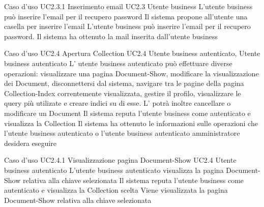 \UCtitle
{Caso d'uso UC2.3.1}
{Inserimento email}
\UC
{UC2.3}
{Utente business}
{L'utente business può inserire l'email per il recupero password}
{Il sistema propone all'utente una casella per inserire l'email}
\scenario
{L'utente business può inserire l'email per il recupero password.}
\post
{Il sistema ha ottenuto la mail inserita dall'utente business}


\UCtitle
{Caso d'uso UC2.4}
{Apertura Collection}
\UC
{UC2.4}
{Utente business autenticato, Utente business autenticato }
{L’ utente business autenticato può effettuare diverse operazioni: visualizzare una pagina Document-Show, modificare la visualizzazione dei Document, disconnettersi dal sistema, navigare tra le pagine della pagina Collection-Index correntemente visualizzata,  gestire il profilo, visualizzare le query più utilizate e creare indici su di esse. L' potrà inoltre cancellare o modificare un Document}
{Il sistema reputa l'utente business come autenticato e visualizza la Collection}
\post
{Il sistema ha ottenuto le informazioni sulle operazioni che l'utente business autenticato o l'utente business autenticato amministratore desidera eseguire}



\UCtitle
{Caso d'uso UC2.4.1}
{Visualizzazione pagina Document-Show}
\UC
{UC2.4}
{Utente business autenticato}
{L'utente business autenticato visualizza la pagina Document-Show relativa alla chiave selezionata}
{Il sistema reputa l'utente business come autenticato e visualizza la Collection scelta}
\post
{Viene visualizzata la pagina Document-Show relativa alla chiave selezionata}

